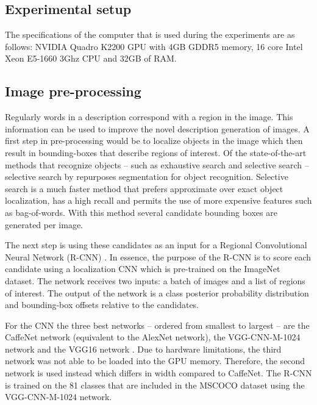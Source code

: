 \subsection{Experimental setup}
The specifications of the computer that is used during the experiments are as follows: NVIDIA Quadro K2200 GPU with 4GB GDDR5 memory, 16 core Intel Xeon E5-1660 3Ghz CPU and 32GB of RAM.

\subsection{Image pre-processing}
Regularly words in a description correspond with a region in the image. This information can be used to improve the novel description generation of images. A first step in pre-processing would be to localize objects in the image which then result in bounding-boxes that describe regions of interest. Of the state-of-the-art methods that recognize objects -- such as exhaustive search \cite{zhu2010latent, felzenszwalb2010object} and selective search \cite{Sande2011} -- selective search by \citeauthor{Sande2011} repurposes segmentation for object recognition. Selective search is a much faster method that prefers approximate over exact object localization, has a high recall and permits the use of more expensive features such as bag-of-words. With this method several candidate bounding boxes are generated per image.  

The next step is using these candidates as an input for a Regional Convolutional Neural Network (R-CNN) \cite{girshick2015fast}. In essence, the purpose of the R-CNN is to score each candidate using a localization CNN which is pre-trained on the ImageNet dataset. The network receives two inputs: a batch of images and a list of regions of interest. The output of the network is a class posterior probability distribution and bounding-box offsets relative to the candidates. 

For the CNN the three best networks -- ordered from smallest to largest -- are the CaffeNet network \cite{Girshick2014} (equivalent to the AlexNet network), the VGG-CNN-M-1024 network \cite{chatfield2014return} and the VGG16 network \cite{simonyan2014very}. Due to hardware limitations, the third network was not able to be loaded into the GPU memory. Therefore, the second network is used instead which differs in width compared to CaffeNet.
The R-CNN is trained on the 81 classes that are included in the MSCOCO dataset using the VGG-CNN-M-1024 network.

